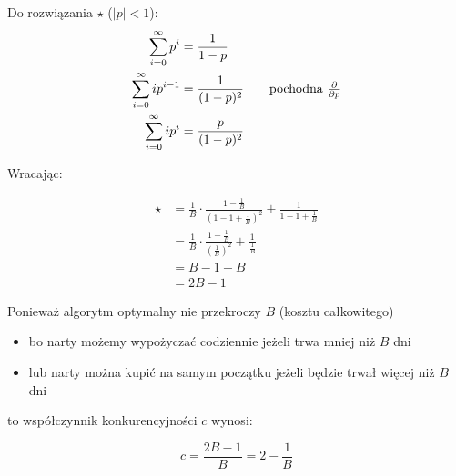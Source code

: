 \documentclass{homeworg}
\begin{document}
Do rozwiązania $\star$ ($|p| < 1$):
\begin{align*}
    \sum_{i=0}^{\infty} p^i &= \frac{1}{1 - p} \\
    \sum_{i=0}^{\infty} ip^{i-1} &= \frac{1}{(1-p)^2} \tag*{pochodna $\frac{\partial}{\partial p}$} \\
    \sum_{i=0}^{\infty} ip^i &= \frac{p}{(1-p)^2} \\
\end{align*}

Wracając:

\begin{align*}
    \star &= \frac{1}{B} \cdot \frac{1 - \frac{1}{B}}{(1 - 1 + \frac{1}{B})^2} + \frac{1}{1 - 1 + \frac{1}{B}} \\
    &= \frac{1}{B} \cdot \frac{1 - \frac{1}{B}}{(\frac{1}{B})^2} + \frac{1}{\frac{1}{B}} \\
    &= B - 1 + B \\
    &= 2B - 1
\end{align*}

Ponieważ algorytm optymalny nie przekroczy $B$ (kosztu całkowitego)
\begin{itemize}
    \item bo narty możemy wypożyczać codziennie jeżeli trwa mniej niż $B$ dni
    \item lub narty można kupić na samym początku jeżeli będzie trwał więcej niż $B$ dni
\end{itemize}

to współczynnik konkurencyjności $c$ wynosi:

$$ c = \frac{2B - 1}{B} = 2 - \frac{1}{B} $$
\end{document}
